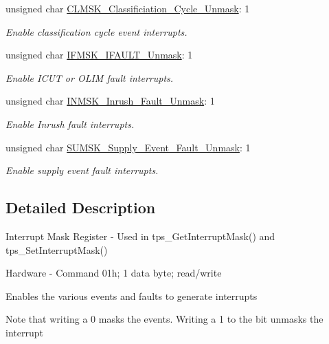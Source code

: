 \begin{DoxyCompactItemize}
unsigned char \hyperlink{struct_t_p_s238_x___interrupt___mask___register__t_a6ba099867a733b5d3f19a9cff6092571}{C\-L\-M\-S\-K\-\_\-\-Classificiation\-\_\-\-Cycle\-\_\-\-Unmask}\-: 1
\begin{DoxyCompactList}\small\item\em Enable classification cycle event interrupts. \end{DoxyCompactList}\item 
unsigned char \hyperlink{struct_t_p_s238_x___interrupt___mask___register__t_a219b299138bcac44e2eed4da0eda1512}{I\-F\-M\-S\-K\-\_\-\-I\-F\-A\-U\-L\-T\-\_\-\-Unmask}\-: 1
\begin{DoxyCompactList}\small\item\em Enable I\-C\-U\-T or O\-L\-I\-M fault interrupts. \end{DoxyCompactList}\item 
unsigned char \hyperlink{struct_t_p_s238_x___interrupt___mask___register__t_a9a6ba5767eb3a7cb2bf5738b22cc6cb7}{I\-N\-M\-S\-K\-\_\-\-Inrush\-\_\-\-Fault\-\_\-\-Unmask}\-: 1
\begin{DoxyCompactList}\small\item\em Enable Inrush fault interrupts. \end{DoxyCompactList}\item 
unsigned char \hyperlink{struct_t_p_s238_x___interrupt___mask___register__t_a85c1d4453b3757e2311c4e4ece90e095}{S\-U\-M\-S\-K\-\_\-\-Supply\-\_\-\-Event\-\_\-\-Fault\-\_\-\-Unmask}\-: 1
\begin{DoxyCompactList}\small\item\em Enable supply event fault interrupts. \end{DoxyCompactList}\end{DoxyCompactItemize}


\subsection{Detailed Description}
Interrupt Mask Register -\/ Used in tps\-\_\-\-Get\-Interrupt\-Mask() and tps\-\_\-\-Set\-Interrupt\-Mask() \par
 Hardware -\/ Command 01h; 1 data byte; read/write \par
\par
 Enables the various events and faults to generate interrupts \begin{DoxyNote}{Note}
that writing a 0 masks the events. Writing a 1 to the bit unmasks the interrupt 
\end{DoxyNote}


